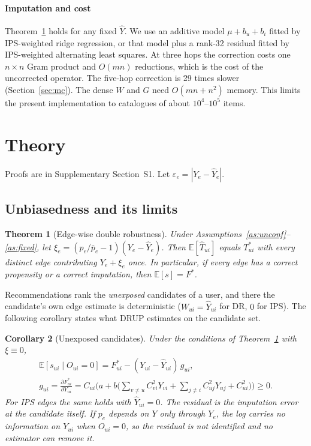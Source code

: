 \documentclass[preprint,review,12pt,authoryear]{elsarticle}
\newtheorem{theorem}{Theorem}
\newtheorem{corollary}[theorem]{Corollary}
\theoremstyle{definition}
\newcommand{\E}{\mathbb{E}}
\begin{document}
\paragraph{Imputation and cost}
Theorem~\ref{thm:unbiased} holds for any fixed $\hat Y$. We use an additive model
$\mu+b_u+b_i$ fitted by IPS-weighted ridge regression, or that model plus a rank-32
residual fitted by IPS-weighted alternating least squares. At three hops the
correction costs one $n\times n$ Gram product and $O(mn)$ reductions, which is the cost of the
uncorrected operator. The five-hop correction is 29 times slower (Section~\ref{sec:mc}).
The dense $W$ and $G$ need $O(mn+n^2)$ memory. This limits the present implementation to
catalogues of about $10^4$--$10^5$ items.

\section{Theory}

Proofs are in Supplementary Section~S1. Let $\varepsilon_e=|Y_e-\hat Y_e|$.

\subsection{Unbiasedness and its limits}

\begin{theorem}[Edge-wise double robustness]\label{thm:unbiased}
Under Assumptions~\ref{as:unconf}--\ref{as:fixed}, let
$\xi_e=(p_e/\bar p_e-1)(Y_e-\hat Y_e)$. Then $\E[\hat T_{ui}]$ equals $T^*_{ui}$
with every distinct edge contributing $Y_e+\xi_e$ once. In particular, if
every edge has a correct propensity or a correct imputation, then
$\E[s]=F^*$.
\end{theorem}

Recommendations rank the \emph{unexposed} candidates of a user, and there
the candidate's own edge estimate is deterministic ($W_{ui}=\hat Y_{ui}$ for DR,
$0$ for IPS). The following corollary states what DRUP estimates on the
candidate set.

\begin{corollary}[Unexposed candidates]\label{cor:cand}
Under the conditions of Theorem~\ref{thm:unbiased} with $\xi\equiv0$,
\begin{gather*}
\E[s_{ui}\mid O_{ui}=0]=F^*_{ui}-(Y_{ui}-\hat Y_{ui})\,g_{ui},\\
g_{ui}=\frac{\partial F^*_{ui}}{\partial Y_{ui}}
=C_{ui}\Big(a+b\big(\textstyle\sum_{v\neq u}C_{vi}^2Y_{vi}+\sum_{j\neq i}C_{uj}^2Y_{uj}+C_{ui}^2\big)\Big)\ge0 .
\end{gather*}
For IPS edges the same holds with $\hat Y_{ui}=0$. The residual is the
imputation error at the candidate itself. If $p_e$ depends on $Y$ only through
$Y_e$, the log carries no information on $Y_{ui}$ when $O_{ui}=0$, so the
residual is not identified and no estimator can remove it.
\end{corollary}
\end{document}
